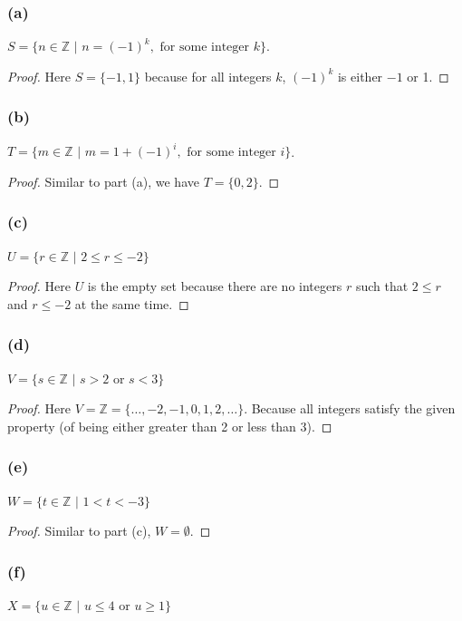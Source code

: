 \documentclass[14pt]{extarticle}
\newcommand{\Z}{\mathbb{Z}}
\begin{document}
\subsubsection{(a)}
$S = \{n \in \Z \,\, | \,\, n = (-1)^k, \text{ for some integer } k\}$.

\begin{proof}
Here $S = \{-1, 1\}$ because for all integers $k$, $(-1)^k$ is either $-1$ or 1.
\end{proof}

\subsubsection{(b)}
$T = \{m \in \Z \,\, | \,\, m = 1 + (-1)^i, \text{ for some integer } i\}$.

\begin{proof}
Similar to part (a), we have $T = \{0, 2\}$.
\end{proof}

\subsubsection{(c)}
$U = \{r \in \Z \,\, | \,\, 2 \leq r \leq -2\}$

\begin{proof}
Here $U$ is the empty set because there are no integers $r$ such that $2 \leq r$
and $r \leq -2$ at the same time.
\end{proof}

\subsubsection{(d)}
$V = \{s \in \Z \,\, | \,\, s > 2 \text{ or } s < 3\}$

\begin{proof}
Here $V = \Z = \{\ldots, -2, -1, 0, 1, 2, \ldots\}$. Because all integers satisfy
the given property (of being either greater than 2 or less than 3).
\end{proof}

\subsubsection{(e)}
$W = \{t \in \Z \,\, | \,\, 1 < t < -3\}$

\begin{proof}
Similar to part (c), $W = \emptyset$.
\end{proof}

\subsubsection{(f)}
$X = \{u \in \Z \,\, | \,\, u \leq 4 \text{ or } u \geq 1\}$
\end{document}
